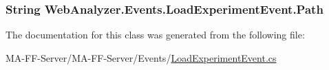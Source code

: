 \subsubsection[{Path}]{\setlength{\rightskip}{0pt plus 5cm}String Web\+Analyzer.\+Events.\+Load\+Experiment\+Event.\+Path\hspace{0.3cm}{\ttfamily [get]}}\label{class_web_analyzer_1_1_events_1_1_load_experiment_event_ac86cf22d02cb0c13c9ea9437422b5142}


The documentation for this class was generated from the following file\+:\begin{DoxyCompactItemize}
\item 
M\+A-\/\+F\+F-\/\+Server/\+M\+A-\/\+F\+F-\/\+Server/\+Events/\hyperlink{_load_experiment_event_8cs}{Load\+Experiment\+Event.\+cs}\end{DoxyCompactItemize}
